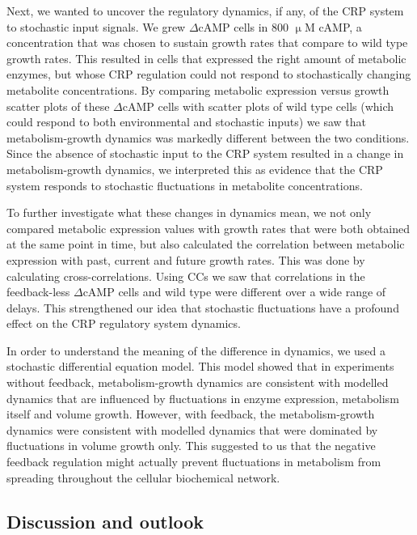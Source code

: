 Next, we wanted to 
uncover
the regulatory dynamics, if any, of the CRP system to stochastic input signals.
%
We grew  $\Delta$cAMP cells in 800 $\upmu$M cAMP,
a concentration that was chosen to sustain growth rates that compare to wild type growth rates.
%
This resulted in cells that expressed the right amount of metabolic enzymes, 
but whose CRP regulation could not respond to stochastically changing metabolite concentrations.
%
By comparing metabolic expression versus growth scatter plots of these $\Delta$cAMP cells with
scatter plots of wild type cells (which could respond to both environmental and stochastic inputs)  
we saw that metabolism-growth dynamics was markedly different between the two conditions.
%
Since the absence 
of stochastic input to the CRP system resulted in a change in metabolism-growth dynamics, 
we interpreted this as evidence that the CRP system responds to stochastic fluctuations in metabolite concentrations.

To further investigate what these changes in dynamics mean, 
we not only compared metabolic expression values with growth rates that were both obtained at the same point in time,
but also calculated the correlation between metabolic expression with past, current and future growth rates.
%
This was done by calculating cross-correlations.
%
Using CCs we saw that correlations in the feedback-less $\Delta$cAMP cells and wild type were different over a wide range of delays.
%
This strengthened our idea that stochastic fluctuations have a profound effect on the CRP regulatory system dynamics.

In order to understand the meaning of the difference in dynamics, we used a stochastic differential equation model.
%
This model showed that in experiments without feedback, metabolism-growth dynamics are consistent with modelled dynamics that are influenced by fluctuations in enzyme expression, metabolism itself and volume growth.
% 
However, with feedback, the metabolism-growth dynamics were consistent with modelled dynamics that were dominated by fluctuations in volume growth only.
%
This suggested to us that the negative feedback regulation might actually 
prevent fluctuations in metabolism from spreading throughout the cellular biochemical network.

\subsection*{Discussion and outlook}


